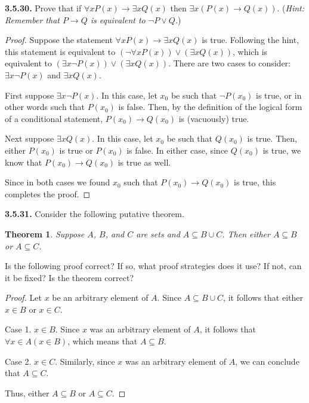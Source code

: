 \documentclass[12pt]{amsart}
\newenvironment{statement}[1]{\smallskip\noindent\color[rgb]{.6627, .3529, .6314} {\bf #1.}}{}
\newtheorem{theorem}{Theorem}
\theoremstyle{definition}
\theoremstyle{remark}
\begin{document}
\begin{statement}{3.5.30}
Prove that if $\forall x P(x) \rightarrow \exists x Q(x)$ then $\exists x (P(x) \rightarrow Q(x))$.
(\emph{Hint: Remember that $P \rightarrow Q$ is equivalent to $\neg P \vee Q$.})
\end{statement}

\begin{proof}
Suppose the statement $\forall x P(x) \rightarrow \exists x Q(x)$ is true.
Following the hint, this statement is equivalent to $(\neg \forall x P(x)) \vee (\exists x Q(x))$, which is equivalent to $(\exists x \neg P(x)) \vee (\exists x Q(x))$.
There are two cases to consider: $\exists x \neg P(x)$ and $\exists x Q(x)$.

First suppose $\exists x \neg P(x)$.
In this case, let $x_0$ be such that $\neg P(x_0)$ is true, or in other words such that $P(x_0)$ is false.
Then, by the definition of the logical form of a conditional statement, $P(x_0) \rightarrow Q(x_0)$ is (vacuously) true.

Next suppose $\exists x Q(x)$.
In this case, let $x_0$ be such that $Q(x_0)$ is true.
Then, either $P(x_0)$ is true or $P(x_0)$ is false.
In either case, since $Q(x_0)$ is true, we know that $P(x_0) \rightarrow Q(x_0)$ is true as well.

Since in both cases we found $x_0$ such that $P(x_0) \rightarrow Q(x_0)$ is true, this completes the proof.
\end{proof}


\begin{statement}{3.5.31}
Consider the following putative theorem.
\begin{theorem}
	Suppose $A$, $B$, and $C$ are sets and $A \subseteq B \cup C$.
	Then either $A \subseteq B$ or $A \subseteq C$.
\end{theorem}
Is the following proof correct?
If so, what proof strategies does it use?
If not, can it be fixed?
Is the theorem correct?
\begin{proof}
	Let $x$ be an arbitrary element of $A$.
	Since $A \subseteq B \cup C$, it follows that either $x \in B$ or $x \in C$.
	
	Case 1. $x \in B$.
	Since $x$ was an arbitrary element of $A$, it follows that $\forall x \in A (x \in B)$,
	which means that $A \subseteq B$.
	
	Case 2. $x \in C$.
	Similarly, since $x$ was an arbitrary element of $A$, we can conclude that $A \subseteq C$.
	
	Thus, either $A \subseteq B$ or $A \subseteq C$.
\end{proof}
\end{statement}
\end{document}
